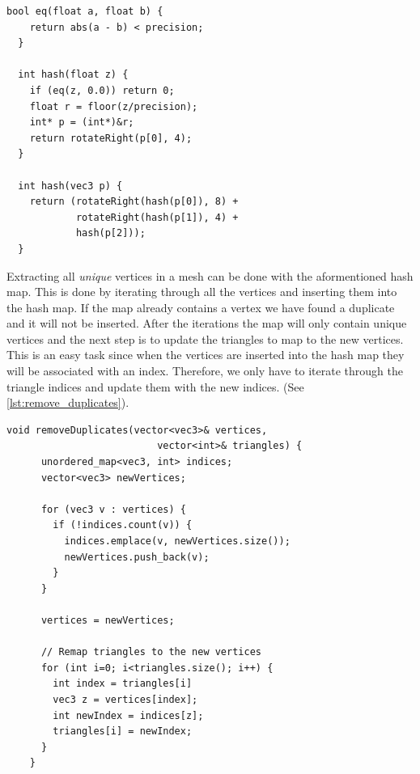 \begin{minipage}{\linewidth}
\begin{lstlisting}[caption={Hashing 3D point}, label={lst:hash3D}]
  bool eq(float a, float b) {
    return abs(a - b) < precision;
  }
  
  int hash(float z) {
    if (eq(z, 0.0)) return 0;
    float r = floor(z/precision);
    int* p = (int*)&r;
    return rotateRight(p[0], 4);
  }
  
  int hash(vec3 p) {
    return (rotateRight(hash(p[0]), 8) +
            rotateRight(hash(p[1]), 4) +
            hash(p[2]));
  }
\end{lstlisting}
\end{minipage}

Extracting all \emph{unique} vertices in a mesh can be done with the aformentioned hash map. This is done by iterating through all the vertices and inserting them into the hash map. If the map already contains a vertex we have found a duplicate and it will not be inserted. After the iterations the map will only contain unique vertices and the next step is to update the triangles to map to the new vertices. This is an easy task since when the vertices are inserted into the hash map they will be associated with an index. Therefore, we only have to iterate through the triangle indices and update them with the new indices. (See \cref{lst:remove_duplicates}).

\begin{minipage}{\linewidth}
  \begin{lstlisting}[caption={Removing duplicates}, label={lst:remove_duplicates}]
    void removeDuplicates(vector<vec3>& vertices,
                          vector<int>& triangles) {
      unordered_map<vec3, int> indices;
      vector<vec3> newVertices;
      
      for (vec3 v : vertices) {
        if (!indices.count(v)) {
          indices.emplace(v, newVertices.size());
          newVertices.push_back(v);
        }
      }

      vertices = newVertices;

      // Remap triangles to the new vertices
      for (int i=0; i<triangles.size(); i++) {
        int index = triangles[i]
        vec3 z = vertices[index];
        int newIndex = indices[z];
        triangles[i] = newIndex;
      }
    }
\end{lstlisting}
\end{minipage}


